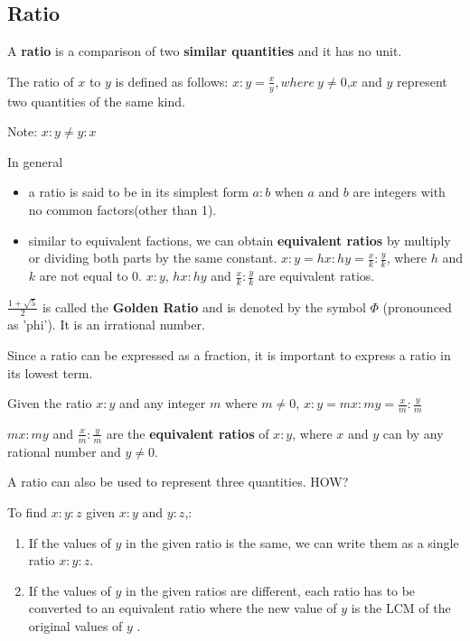 \documentclass[../main]{subfiles}
\begin{document}
\subsection{Ratio}
A \textbf{ratio} is a comparison of two \textbf{similar quantities} and it has
no unit.

The ratio of $x$ to $y$ is defined as follows:
\(x:y={\frac x y}, where\ y \neq 0\),$x$ and $y$ represent two quantities of the
same kind.

Note: \(x:y \neq y:x\)

In general
\begin{itemize}
\item a ratio is said to be in its simplest form $a:b$ when $a$ and $b$ are
  integers with no common factors(other than 1).
 
\item similar to equivalent factions, we can obtain \textbf{equivalent ratios}
  by multiply or dividing both parts by the same constant.
  \(x:y=hx:hy={\frac x k}:{\frac y k}\), where $h$ and $k$ are not equal to 0.
  $x:y$, $hx:hy$ and \({\frac x k}:{\frac y k}\) are equivalent ratios. 
\end{itemize}

\(\frac {1 + \sqrt 5} 2\) is called the \textbf{Golden Ratio} and is denoted by
the symbol $\Phi$ (pronounced as 'phi'). It is an irrational number.

Since a ratio can be expressed as a fraction, it is important to express a ratio
in its lowest term.

Given the ratio \(x:y\) and any integer $m$ where \(m \neq 0\), \(x:y = mx:my =
{\frac x m}:{\frac y m}\)

\(mx:my\) and \({\frac x m}:{\frac y m}\) are the \textbf{equivalent ratios} of
\(x:y\), where $x$ and $y$ can by any rational number and \(y \neq 0\).

A ratio can also be used to represent three quantities. HOW?

To find \(x:y:z\) given \(x:y\) and \(y:z\),:
\begin{enumerate}
\item If the values of $y$ in the given ratio is the same, we can write them as
  a single ratio \(x:y:z\).
 
\item If the values of $y$ in the given ratios are different, each ratio has to
  be converted to an equivalent ratio where the new value of $y$ is the LCM of
  the original values of $y$ .
  
\end{enumerate}
\end{document}
